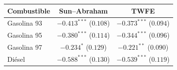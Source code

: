 \begin{tabular}{lcc}
\toprule
Combustible & Sun--Abraham & TWFE \\
\midrule
Gasolina 93 & $-0.413^{***}$ ($0.108$) & $-0.373^{***}$ ($0.094$) \\
Gasolina 95 & $-0.380^{***}$ ($0.114$) & $-0.344^{***}$ ($0.096$) \\
Gasolina 97 & $-0.234^{*}$ ($0.129$) & $-0.221^{**}$ ($0.090$) \\
Diésel & $-0.588^{***}$ ($0.130$) & $-0.539^{***}$ ($0.119$) \\
\bottomrule
\end{tabular}

